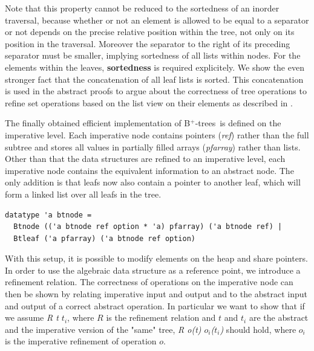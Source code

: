\documentclass[a4paper,UKenglish,cleveref, autoref, thm-restate]{lipics-v2021}
\newcommand{\btrees}{B$^+$-trees}
\begin{document}
Note that this property cannot be reduced to the sortedness of an inorder traversal,
because whether or not an element is allowed to be equal to a separator or not
depends on the precise relative position within the tree, not only on its position in the traversal.
Moreover the separator to the right of its preceding separator must be smaller,
implying sortedness of all lists within nodes.
For the elements within the leaves, \textbf{sortedness} is required explicitely.
We show the even stronger fact that the concatenation of all leaf lists is sorted.
This concatenation is used in the abstract proofs to
argue about the correctness of tree operations to refine set operations
based on the list view on their elements
as described in \cite{DBLP:conf/itp/Nipkow16}.

The finally obtained efficient implementation of \btrees\ is defined
on the imperative level.
Each imperative node contains pointers (\emph{ref}) rather than the full subtree and
stores all values in partially filled arrays (\emph{pfarray}) rather than lists.
Other than that the data structures are refined to an imperative level,
each imperative node contains the equivalent information to an abstract node.
The only addition is that leafs now also contain a pointer to another leaf,
which will form a linked list over all leafs in the tree.

\begin{lstlisting}[mathescape=true, language=Isabelle,label=lst:btree-imp-def]
datatype 'a btnode =
  Btnode (('a btnode ref option * 'a) pfarray) ('a btnode ref) |
  Btleaf ('a pfarray) ('a btnode ref option)
\end{lstlisting}

With this setup, it is possible to modify elements on the heap and share pointers.
In order to use the algebraic data structure as a reference point,
we introduce a refinement relation.
The correctness of operations on the imperative node
can then be shown by relating imperative input and output
and to the abstract input and output of a correct abstract operation.
In particular we want to show that if we assume \emph{R t $t_i$},
where $R$ is the refinement relation and $t$ and $t_i$ are the abstract
and the imperative version of the "same" tree,
\emph{R o(t) $o_i$($t_i$)} should hold, where $o_i$ is the imperative refinement
of operation $o$.
\end{document}
